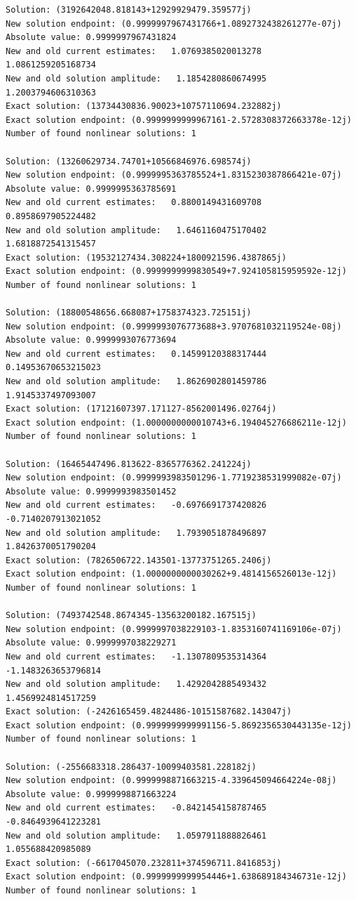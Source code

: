 \documentclass{article}
\begin{document}
\begin{verbatim}
Solution: (3192642048.818143+12929929479.359577j)
New solution endpoint: (0.9999997967431766+1.0892732438261277e-07j) Absolute value: 0.9999997967431824
New and old current estimates:   1.0769385020013278    1.0861259205168734
New and old solution amplitude:   1.1854280860674995    1.2003794606310363
Exact solution: (13734430836.90023+10757110694.232882j)
Exact solution endpoint: (0.9999999999967161-2.5728308372663378e-12j)
Number of found nonlinear solutions: 1

Solution: (13260629734.74701+10566846976.698574j)
New solution endpoint: (0.9999995363785524+1.8315230387866421e-07j) Absolute value: 0.9999995363785691
New and old current estimates:   0.8800149431609708    0.8958697905224482
New and old solution amplitude:   1.6461160475170402    1.6818872541315457
Exact solution: (19532127434.308224+1800921596.4387865j)
Exact solution endpoint: (0.9999999999830549+7.924105815959592e-12j)
Number of found nonlinear solutions: 1

Solution: (18800548656.668087+1758374323.725151j)
New solution endpoint: (0.9999993076773688+3.9707681032119524e-08j) Absolute value: 0.9999993076773694
New and old current estimates:   0.14599120388317444    0.14953670653215023
New and old solution amplitude:   1.8626902801459786    1.9145337497093007
Exact solution: (17121607397.171127-8562001496.02764j)
Exact solution endpoint: (1.0000000000010743+6.194045276686211e-12j)
Number of found nonlinear solutions: 1

Solution: (16465447496.813622-8365776362.241224j)
New solution endpoint: (0.9999993983501296-1.7719238531999082e-07j) Absolute value: 0.9999993983501452
New and old current estimates:   -0.6976691737420826    -0.7140207913021052
New and old solution amplitude:   1.7939051878496897    1.8426370051790204
Exact solution: (7826506722.143501-13773751265.2406j)
Exact solution endpoint: (1.0000000000030262+9.4814156526013e-12j)
Number of found nonlinear solutions: 1

Solution: (7493742548.8674345-13563200182.167515j)
New solution endpoint: (0.9999997038229103-1.8353160741169106e-07j) Absolute value: 0.9999997038229271
New and old current estimates:   -1.1307809535314364    -1.1483263653796814
New and old solution amplitude:   1.4292042885493432    1.4569924814517259
Exact solution: (-2426165459.4824486-10151587682.143047j)
Exact solution endpoint: (0.9999999999991156-5.8692356530443135e-12j)
Number of found nonlinear solutions: 1

Solution: (-2556683318.286437-10099403581.228182j)
New solution endpoint: (0.9999998871663215-4.339645094664224e-08j) Absolute value: 0.9999998871663224
New and old current estimates:   -0.8421454158787465    -0.8464939641223281
New and old solution amplitude:   1.0597911888826461    1.055688420985089
Exact solution: (-6617045070.232811+374596711.8416853j)
Exact solution endpoint: (0.9999999999954446+1.638689184346731e-12j)
Number of found nonlinear solutions: 1


\end{verbatim}
\end{document}
